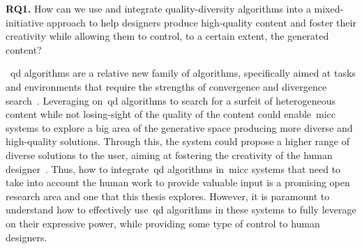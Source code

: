 \begin{retQuestion}{}
   \textbf{RQ1.} How can we use and integrate quality-diversity algorithms into a mixed-initiative approach to help designers produce high-quality content and foster their creativity while allowing them to control, to a certain extent, the generated content?
\end{retQuestion}

~\acrfull{qd} algorithms are a relative new family of algorithms, specifically aimed at tasks and environments that require the strengths of convergence and divergence search~\cite{Pugh2016}. Leveraging on~\acrshort{qd} algorithms to search for a surfeit of heterogeneous content while not losing-sight of the quality of the content could enable~\acrshort{micc} systems to explore a big area of the generative space producing more diverse and high-quality solutions. Through this, the system could propose a higher range of diverse solutions to the user, aiming at fostering the creativity of the human designer~\cite{liapis2016-canmixedinitiative}. Thus, how to integrate~\acrshort{qd} algorithms in~\acrshort{micc} systems that need to take into account the human work to provide valuable input is a promising open research area and one that this thesis explores. However, it is paramount to understand how to effectively use~\acrshort{qd} algorithms in these systems to fully leverage on their expressive power, while providing some type of control to human designers. 





